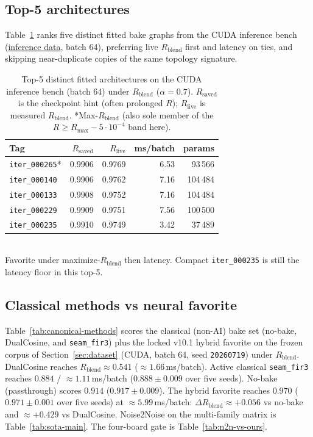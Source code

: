 \subsection{Top-5 architectures}
\label{sec:top5-arch}
Table~\ref{tab:top5} ranks five distinct fitted bake graphs from the CUDA inference bench
(\href{https://github.com/reeldemo/denoise-opt-meta/blob/master/paper/Unsupervised_Wrap-Discontinuity_Repair_in_Wavetable_Synthesis_via_Hybrid_GA-PPO_Meta-Search_v12/figures/inference_bench.json}{inference data}, batch 64), preferring live $R_{\mathrm{blend}}$ first and latency on ties,
and skipping near-duplicate copies of the same topology signature.

\begin{table}[t]
  \centering
  \caption{Top-5 distinct fitted architectures on the CUDA inference bench (batch 64) under $R_{\mathrm{blend}}$ ($\alpha{=}0.7$).
  $R_{\mathrm{saved}}$ is the checkpoint hint (often prolonged $R$); $R_{\mathrm{live}}$ is measured $R_{\mathrm{blend}}$.
  *Max-$R_{\mathrm{blend}}$ (also sole member of the $R\ge R_{\max}-5\cdot10^{-4}$ band here).}
  \label{tab:top5}
  \setlength{\tabcolsep}{3pt}
  \begin{tabular}{@{}lrrrr@{}}
    \toprule
    Tag & $R_{\mathrm{saved}}$ & $R_{\mathrm{live}}$ & ms/batch & params \\
    \midrule
    \texttt{iter\_000265}* & 0.9906 & 0.9769 & 6.53 & 93\,566 \\
    \texttt{iter\_000140} & 0.9906 & 0.9762 & 7.16 & 104\,484 \\
    \texttt{iter\_000133} & 0.9908 & 0.9752 & 7.16 & 104\,484 \\
    \texttt{iter\_000229} & 0.9909 & 0.9751 & 7.56 & 100\,500 \\
    \texttt{iter\_000235} & 0.9910 & 0.9749 & 3.42 & 37\,489 \\
    \bottomrule
  \end{tabular}\\[0.4em]
  {\footnotesize *Favorite under maximize-$R_{\mathrm{blend}}$ then latency. Compact \texttt{iter\_000235} is still the latency floor in this top-5.}
\end{table}

\subsection{Classical methods vs neural favorite}
\label{sec:classical-vs-favorite}
Table~\ref{tab:canonical-methods} scores the classical (non-AI) bake set (no-bake, DualCosine, and \texttt{seam\_fir3}) plus the locked v10.1 hybrid favorite on the frozen corpus of Section~\ref{sec:dataset} (CUDA, batch 64, seed \texttt{20260719}) under $R_{\mathrm{blend}}$.
DualCosine reaches $R_{\mathrm{blend}}\approx 0.541$ ($\approx 1.66$\,ms/batch).
Active classical \texttt{seam\_fir3} reaches $0.884$ / $\approx 1.11$\,ms/batch ($0.888\pm0.009$ over five seeds).
No-bake (passthrough) scores $0.914$ ($0.917\pm0.009$).
The hybrid favorite reaches $0.970$ ($0.971\pm0.001$ over five seeds) at $\approx 5.99$\,ms/batch:
$\Delta R_{\mathrm{blend}} \approx {+}0.056$ vs no-bake and $\approx {+}0.429$ vs DualCosine.
Noise2Noise on the multi-family matrix is Table~\ref{tab:sota-main}. The four-board gate is Table~\ref{tab:n2n-vs-ours}.

